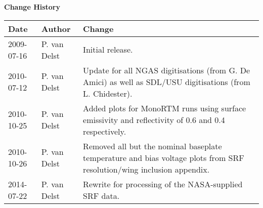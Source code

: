 \thispagestyle{empty}
\vspace*{10cm}
\begin{center}
  {\sffamily\Large\bfseries Change History}
  \begin{table}[htp]
    \centering
    \begin{tabular}{|p{2cm}|p{3cm}|p{8cm}|}
      \hline
      \sffamily\textbf{Date} & \sffamily\textbf{Author} & \sffamily\textbf{Change}\\
      \hline\hline
      2009-07-16 & P. van Delst & Initial release.\\
      \hline
      2010-07-12 & P. van Delst & Update for all NGAS digitisations (from G. De Amici) as well as SDL/USU digitisations (from L. Chidester).\\
      \hline
      2010-10-25 & P. van Delst & Added plots for MonoRTM runs using surface emissivity and reflectivity of 0.6 and 0.4 respectively.\\
      \hline
      2010-10-26 & P. van Delst & Removed all but the nominal baseplate temperature and bias voltage plots from SRF resolution/wing inclusion appendix.\\
      \hline
      2014-07-22 & P. van Delst & Rewrite for processing of the NASA-supplied SRF data.\\
      \hline
    \end{tabular}
  \end{table}
\end{center}
\clearpage
\pagestyle{fancy}
\fancyhead[LE,RO]{\sffamily \rightmark}
\fancyhead[LO,RE]{\sffamily \leftmark}
\setcounter{page}{1}









\clearpage




\begin{appendix}
  
  
  
  
  
  
\end{appendix}




